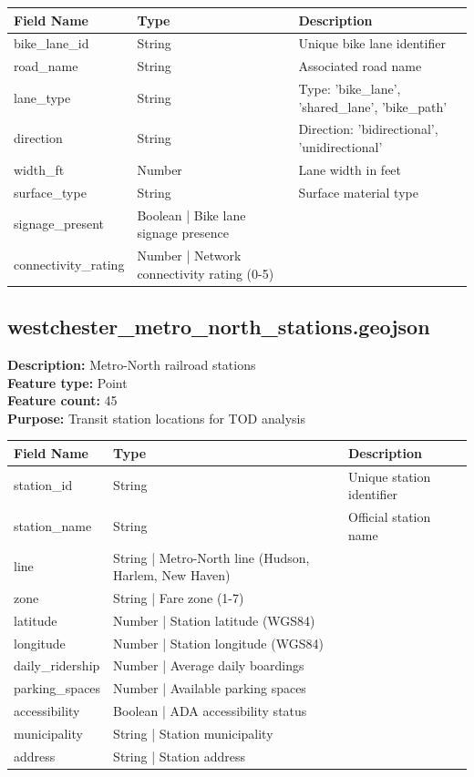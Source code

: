 \documentclass[11pt,letterpaper]{article}
\begin{document}
\begin{table}[h]
\centering
\caption{Attribute Dictionary - westchester\_bike\_lanes.geojson}
\begin{longtable}{lll}
\toprule
\textbf{Field Name} & \textbf{Type} & \textbf{Description} \\
\midrule
bike\_lane\_id & String & Unique bike lane identifier \\
road\_name & String & Associated road name \\
lane\_type & String & Type: 'bike\_lane', 'shared\_lane', 'bike\_path' \\
direction & String & Direction: 'bidirectional', 'unidirectional' \\
width\_ft & Number & Lane width in feet \\
surface\_type & String & Surface material type \\
signage\_present & Boolean | Bike lane signage presence \\
connectivity\_rating & Number | Network connectivity rating (0-5) \\
\bottomrule
\end{longtable}
\end{table}

\subsection{westchester\_metro\_north\_stations.geojson}

\textbf{Description:} Metro-North railroad stations\\
\textbf{Feature type:} Point\\
\textbf{Feature count:} 45\\
\textbf{Purpose:} Transit station locations for TOD analysis

\begin{table}[h]
\centering
\caption{Attribute Dictionary - westchester\_metro\_north\_stations.geojson}
\begin{longtable}{lll}
\toprule
\textbf{Field Name} & \textbf{Type} & \textbf{Description} \\
\midrule
station\_id & String & Unique station identifier \\
station\_name & String & Official station name \\
line & String | Metro-North line (Hudson, Harlem, New Haven) \\
zone & String | Fare zone (1-7) \\
latitude & Number | Station latitude (WGS84) \\
longitude & Number | Station longitude (WGS84) \\
daily\_ridership & Number | Average daily boardings \\
parking\_spaces & Number | Available parking spaces \\
accessibility & Boolean | ADA accessibility status \\
municipality & String | Station municipality \\
address & String | Station address \\
\bottomrule
\end{longtable}
\end{table}
\end{document}
